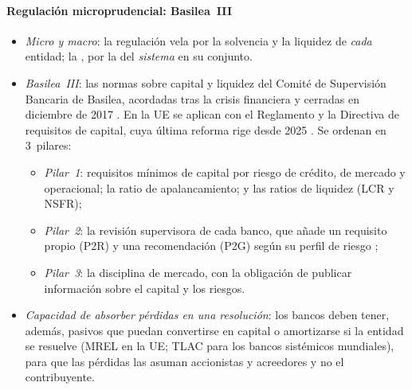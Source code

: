 \documentclass[11pt]{article}
\begin{document}
\paragraph{Regulación microprudencial: Basilea~III}
\begin{itemize}
\item \emph{Micro y macro}: la regulación  vela por la solvencia y la liquidez de \emph{cada} entidad; la , por la del \emph{sistema} en su conjunto.
\item \emph{Basilea~III}: las normas sobre capital y liquidez del Comité de Supervisión Bancaria de Basilea, acordadas tras la crisis financiera y cerradas en diciembre de 2017 \parencite{BCBS2011Basilea3,BCBS2017Basel3}. En la UE se aplican con el Reglamento y la Directiva de requisitos de capital, cuya última reforma rige desde 2025 \parencite{RegUE2013CRR,DirUE2013CRD,RegUE2024CRR3}. Se ordenan en 3~pilares:
  \begin{itemize}
  \item \emph{Pilar~1}: requisitos mínimos de capital por riesgo de crédito, de mercado y operacional; la ratio de apalancamiento; y las ratios de liquidez (LCR y NSFR);
  \item \emph{Pilar~2}: la revisión supervisora de cada banco, que añade un requisito propio (P2R) y una recomendación (P2G) según su perfil de riesgo \parencite{BCE2025SREP};
  \item \emph{Pilar~3}: la disciplina de mercado, con la obligación de publicar información sobre el capital y los riesgos.
  \end{itemize}
\item \emph{Capacidad de absorber pérdidas en una resolución}: los bancos deben tener, además, pasivos que puedan convertirse en capital o amortizarse si la entidad se resuelve (MREL en la UE; TLAC para los bancos sistémicos mundiales), para que las pérdidas las asuman accionistas y acreedores y no el contribuyente.
\end{itemize}
\end{document}
